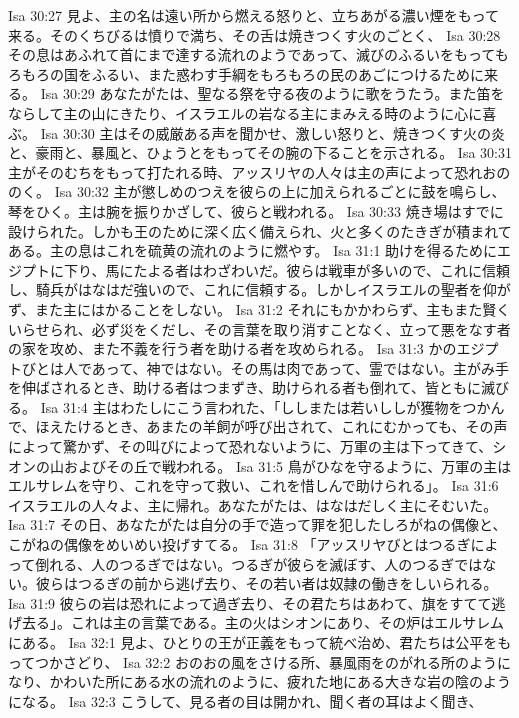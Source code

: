 Isa 30:27  見よ、主の名は遠い所から燃える怒りと、立ちあがる濃い煙をもって来る。そのくちびるは憤りで満ち、その舌は焼きつくす火のごとく、
Isa 30:28  その息はあふれて首にまで達する流れのようであって、滅びのふるいをもってもろもろの国をふるい、また惑わす手綱をもろもろの民のあごにつけるために来る。
Isa 30:29  あなたがたは、聖なる祭を守る夜のように歌をうたう。また笛をならして主の山にきたり、イスラエルの岩なる主にまみえる時のように心に喜ぶ。
Isa 30:30  主はその威厳ある声を聞かせ、激しい怒りと、焼きつくす火の炎と、豪雨と、暴風と、ひょうとをもってその腕の下ることを示される。
Isa 30:31  主がそのむちをもって打たれる時、アッスリヤの人々は主の声によって恐れおののく。
Isa 30:32  主が懲しめのつえを彼らの上に加えられるごとに鼓を鳴らし、琴をひく。主は腕を振りかざして、彼らと戦われる。
Isa 30:33  焼き場はすでに設けられた。しかも王のために深く広く備えられ、火と多くのたきぎが積まれてある。主の息はこれを硫黄の流れのように燃やす。
Isa 31:1  助けを得るためにエジプトに下り、馬にたよる者はわざわいだ。彼らは戦車が多いので、これに信頼し、騎兵がはなはだ強いので、これに信頼する。しかしイスラエルの聖者を仰がず、また主にはかることをしない。
Isa 31:2  それにもかかわらず、主もまた賢くいらせられ、必ず災をくだし、その言葉を取り消すことなく、立って悪をなす者の家を攻め、また不義を行う者を助ける者を攻められる。
Isa 31:3  かのエジプトびとは人であって、神ではない。その馬は肉であって、霊ではない。主がみ手を伸ばされるとき、助ける者はつまずき、助けられる者も倒れて、皆ともに滅びる。
Isa 31:4  主はわたしにこう言われた、「ししまたは若いししが獲物をつかんで、ほえたけるとき、あまたの羊飼が呼び出されて、これにむかっても、その声によって驚かず、その叫びによって恐れないように、万軍の主は下ってきて、シオンの山およびその丘で戦われる。
Isa 31:5  鳥がひなを守るように、万軍の主はエルサレムを守り、これを守って救い、これを惜しんで助けられる」。
Isa 31:6  イスラエルの人々よ、主に帰れ。あなたがたは、はなはだしく主にそむいた。
Isa 31:7  その日、あなたがたは自分の手で造って罪を犯したしろがねの偶像と、こがねの偶像をめいめい投げすてる。
Isa 31:8  「アッスリヤびとはつるぎによって倒れる、人のつるぎではない。つるぎが彼らを滅ぼす、人のつるぎではない。彼らはつるぎの前から逃げ去り、その若い者は奴隷の働きをしいられる。
Isa 31:9  彼らの岩は恐れによって過ぎ去り、その君たちはあわて、旗をすてて逃げ去る」。これは主の言葉である。主の火はシオンにあり、その炉はエルサレムにある。
Isa 32:1  見よ、ひとりの王が正義をもって統べ治め、君たちは公平をもってつかさどり、
Isa 32:2  おのおの風をさける所、暴風雨をのがれる所のようになり、かわいた所にある水の流れのように、疲れた地にある大きな岩の陰のようになる。
Isa 32:3  こうして、見る者の目は開かれ、聞く者の耳はよく聞き、
